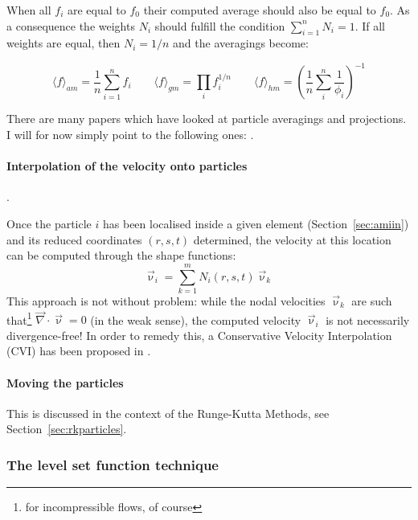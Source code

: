 When all $f_i$ are equal to $f_0$ their computed average should also be equal to $f_0$. As a consequence the 
weights $N_i$ should fulfill the condition $\sum\limits_{i=1}^n N_i=1$.
If all weights are equal, then $N_i=1/n$ and the averagings become:

\begin{equation}
\langle f\rangle_{am} = \frac{1}{n} \sum\limits_{i=1}^n f_i
\qquad
\langle f\rangle_{gm} = \prod_i f_i^{1/n} 
\qquad
\langle f\rangle_{hm} = \left( \frac{1}{n}\sum_i^n \frac{1}{\phi_i} \right)^{-1}
\end{equation}

There are many papers which have looked at particle averagings and projections. 
I will for now simply point to the following ones:
\cite{scbe08}
\cite{deka08}
\cite{dumg11}
\cite{modm03}
\cite{poso08}
\cite{thmk14}
\cite{galh18}
\cite{galb19}.



\paragraph{Interpolation of the velocity onto particles}.

Once the particle $i$ has been localised inside a given element (Section~\ref{sec:amiin}) 
and its reduced coordinates $(r,s,t)$ determined, the velocity at this location can 
be computed through the shape functions:
\[
\vec\upnu_i=\sum_{k=1}^m N_i(r,s,t) \vec\upnu_k
\]
This approach is not without problem: while the nodal velocities $\vec\upnu_k$ are such 
that\footnote{for incompressible flows, of course} 
$\vec\nabla\cdot\vec\upnu=0$ (in the weak sense), the computed velocity $\vec\upnu_i$ 
is not necessarily divergence-free! In order to remedy this, a 
Conservative Velocity Interpolation (CVI) has been proposed in \cite{waav15}.


\paragraph{Moving the particles}

This is discussed in the context of the Runge-Kutta Methods, see Section~\ref{sec:rkparticles}.



\subsubsection{The level set function technique}
    

